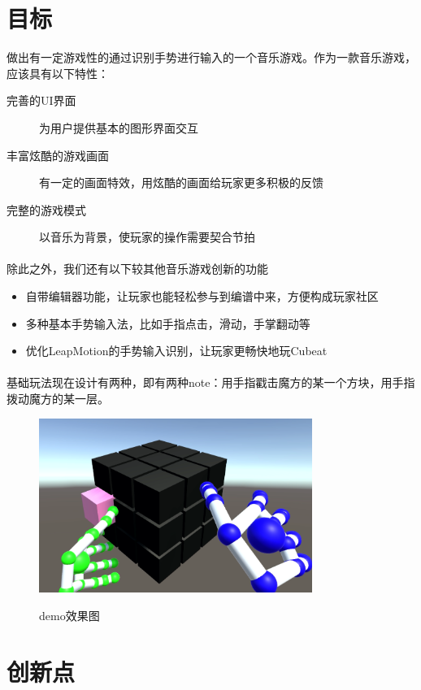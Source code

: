 \documentclass{article}
\begin{document}
\section{目标}
做出有一定游戏性的通过识别手势进行输入的一个音乐游戏。作为一款音乐游戏，应该具有以下特性：
\begin{description}
  \item[完善的UI界面] 为用户提供基本的图形界面交互
  \item[丰富炫酷的游戏画面] 有一定的画面特效，用炫酷的画面给玩家更多积极的反馈
  \item[完整的游戏模式] 以音乐为背景，使玩家的操作需要契合节拍
\end{description}
\paragraph{}
除此之外，我们还有以下较其他音乐游戏创新的功能
\begin{itemize}
  \item 自带编辑器功能，让玩家也能轻松参与到编谱中来，方便构成玩家社区
  \item 多种基本手势输入法，比如手指点击，滑动，手掌翻动等
  \item 优化LeapMotion的手势输入识别，让玩家更畅快地玩Cubeat
\end{itemize}
\paragraph{}
基础玩法现在设计有两种，即有两种note：用手指戳击魔方的某一个方块，用手指拨动魔方的某一层。
\begin{figure}[H]
  \centering
  \includegraphics[width=24em]{demo.png}\\
  \caption{demo效果图}\label{4-1}
\end{figure}

\section{创新点}
\end{document}
